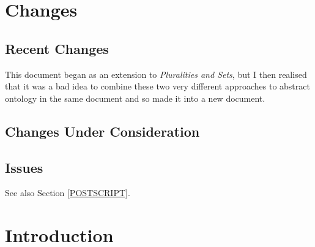 \documentclass[11pt]{article}
\begin{document}
\section{Changes}

\subsection{Recent Changes}

This document began as an extension to \emph{Pluralities and Sets}\cite{rbjt046}, but I then realised that it was a bad idea to combine these two very different approaches to abstract ontology in the same document and so made it into a new document.

\subsection{Changes Under Consideration}


\subsection{Issues}


See also Section \ref{POSTSCRIPT}.

\section{Introduction}
\end{document}
